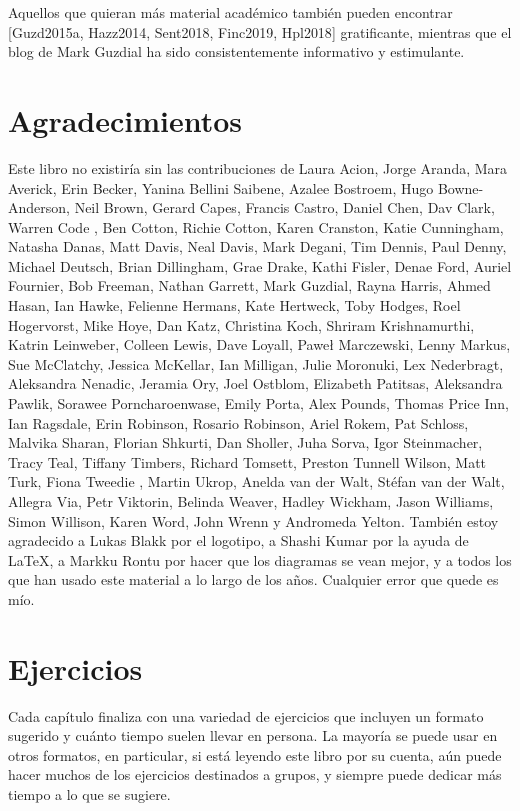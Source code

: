 \documentclass[
]{book}
\begin{document}
Aquellos que quieran más material académico también pueden encontrar {[}Guzd2015a, Hazz2014, Sent2018, Finc2019, Hpl2018{]} gratificante, mientras que el blog de Mark Guzdial ha sido consistentemente informativo y estimulante.

\hypertarget{agradecimientos}{%
\section{Agradecimientos}\label{agradecimientos}}

Este libro no existiría sin las contribuciones de Laura Acion, Jorge Aranda, Mara Averick, Erin Becker, Yanina Bellini Saibene, Azalee Bostroem, Hugo Bowne-Anderson, Neil Brown, Gerard Capes, Francis Castro, Daniel Chen, Dav Clark, Warren Code , Ben Cotton, Richie Cotton, Karen Cranston, Katie Cunningham, Natasha Danas, Matt Davis, Neal Davis, Mark Degani, Tim Dennis, Paul Denny, Michael Deutsch, Brian Dillingham, Grae Drake, Kathi Fisler, Denae Ford, Auriel Fournier, Bob Freeman, Nathan Garrett, Mark Guzdial, Rayna Harris, Ahmed Hasan, Ian Hawke, Felienne Hermans, Kate Hertweck, Toby Hodges, Roel Hogervorst, Mike Hoye, Dan Katz, Christina Koch, Shriram Krishnamurthi, Katrin Leinweber, Colleen Lewis, Dave Loyall, Paweł Marczewski, Lenny Markus, Sue McClatchy, Jessica McKellar, Ian Milligan, Julie Moronuki, Lex Nederbragt, Aleksandra Nenadic, Jeramia Ory, Joel Ostblom, Elizabeth Patitsas, Aleksandra Pawlik, Sorawee Porncharoenwase, Emily Porta, Alex Pounds, Thomas Price Inn, Ian Ragsdale, Erin Robinson, Rosario Robinson, Ariel Rokem, Pat Schloss, Malvika Sharan, Florian Shkurti, Dan Sholler, Juha Sorva, Igor Steinmacher, Tracy Teal, Tiffany Timbers, Richard Tomsett, Preston Tunnell Wilson, Matt Turk, Fiona Tweedie , Martin Ukrop, Anelda van der Walt, Stéfan van der Walt, Allegra Via, Petr Viktorin, Belinda Weaver, Hadley Wickham, Jason Williams, Simon Willison, Karen Word, John Wrenn y Andromeda Yelton. También estoy agradecido a Lukas Blakk por el logotipo, a Shashi Kumar por la ayuda de LaTeX, a Markku Rontu por hacer que los diagramas se vean mejor, y a todos los que han usado este material a lo largo de los años. Cualquier error que quede es mío.

\hypertarget{ejercicios}{%
\section{Ejercicios}\label{ejercicios}}

Cada capítulo finaliza con una variedad de ejercicios que incluyen un formato sugerido y cuánto tiempo suelen llevar en persona. La mayoría se puede usar en otros formatos, en particular, si está leyendo este libro por su cuenta, aún puede hacer muchos de los ejercicios destinados a grupos, y siempre puede dedicar más tiempo a lo que se sugiere.
\end{document}
